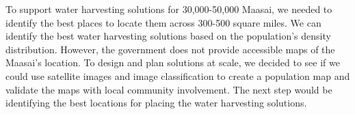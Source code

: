 \documentclass[10pt]{article}
\begin{document}

To support water harvesting solutions for 30,000-50,000 Maasai, we needed to identify the best places to locate them across 300-500 square miles. We can identify the best water harvesting solutions based on the population's density distribution. However, the government does not provide accessible maps of the Maasai's location. To design and plan solutions at scale, we decided to see if we could use satellite images and image classification to create a population map and validate the maps with local community involvement. The next step would be identifying the best locations for placing the water harvesting solutions.





\end{document}
